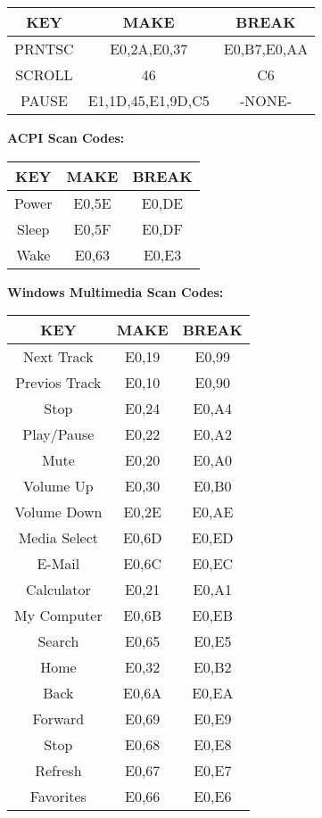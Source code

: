 \documentclass[12pt]{article}
\begin{document}
\begin{tabular}{|c|c|c|}
\hline
	KEY    &        MAKE       &     BREAK     \\ \hline
	PRNTSC &    E0,2A,E0,37    &  E0,B7,E0,AA  \\ \hline
	SCROLL &        46         &     C6        \\ \hline
	PAUSE  & E1,1D,45,E1,9D,C5 &    -NONE-     \\ 
\hline
\end{tabular} 

\vspace*{1 cm}
\hspace*{-1 cm}
\textbf{ACPI Scan Codes:} \\ \newline
\begin{tabular}{|c|c|c|}
\hline
	KEY   & MAKE  & BREAK \\ \hline
	Power & E0,5E & E0,DE \\ \hline
	Sleep & E0,5F & E0,DF \\ \hline
	Wake  & E0,63 & E0,E3 \\ 
\hline
\end{tabular}

\vspace*{1 cm}
\hspace*{-1 cm}
\textbf{Windows Multimedia Scan Codes:} \\ \newline
\begin{tabular}{|c|c|c|}
\hline
	KEY           & MAKE  & BREAK \\ \hline
	Next Track    & E0,19 & E0,99 \\ \hline
	Previos Track & E0,10 & E0,90 \\ \hline
	Stop          & E0,24 & E0,A4 \\ \hline
	Play/Pause    & E0,22 & E0,A2 \\ \hline
	Mute          & E0,20 & E0,A0 \\ \hline
	Volume Up     & E0,30 & E0,B0 \\ \hline
	Volume Down   & E0,2E & E0,AE \\ \hline
	Media Select  & E0,6D & E0,ED \\ \hline
	E-Mail        & E0,6C & E0,EC \\ \hline
	Calculator    & E0,21 & E0,A1 \\ \hline
	My Computer   & E0,6B & E0,EB \\ \hline
	Search        & E0,65 & E0,E5 \\ \hline
	Home          & E0,32 & E0,B2 \\ \hline
	Back          & E0,6A & E0,EA \\ \hline
	Forward       & E0,69 & E0,E9 \\ \hline
	Stop          & E0,68 & E0,E8 \\ \hline
	Refresh       & E0,67 & E0,E7 \\ \hline
	Favorites     & E0,66 & E0,E6 \\ 
\hline
\end{tabular}
\end{document}
